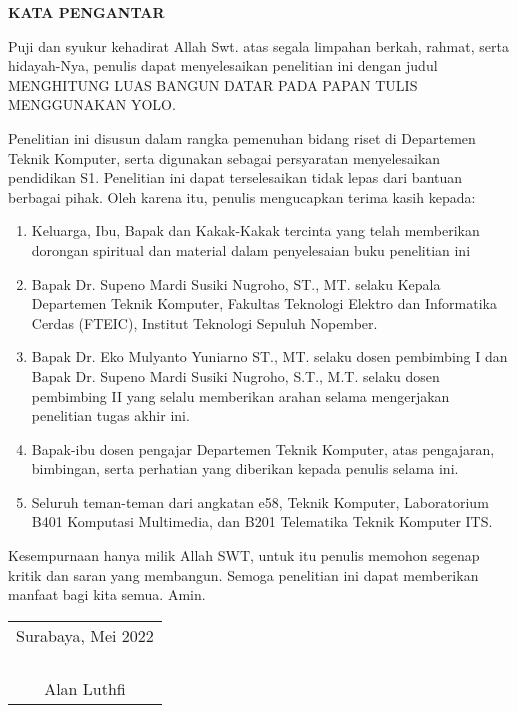 \begin{center}
  \Large
  \textbf{KATA PENGANTAR}
\end{center}


\vspace{2ex}


Puji dan syukur kehadirat Allah Swt. atas segala limpahan
berkah, rahmat, serta hidayah-Nya, penulis dapat menyelesaikan
penelitian ini dengan judul MENGHITUNG LUAS BANGUN DATAR PADA PAPAN TULIS MENGGUNAKAN YOLO.

Penelitian ini disusun dalam rangka pemenuhan bidang riset
di Departemen Teknik Komputer, serta digunakan sebagai persyaratan menyelesaikan pendidikan S1. Penelitian ini dapat terselesaikan tidak lepas dari bantuan berbagai pihak. Oleh karena itu,
penulis mengucapkan terima kasih kepada:

\begin{enumerate}[nolistsep]

  \item Keluarga, Ibu, Bapak dan Kakak-Kakak tercinta yang telah
  memberikan dorongan spiritual dan material dalam penyelesaian buku penelitian ini

  \item Bapak Dr. Supeno Mardi Susiki Nugroho, ST., MT. selaku Kepala Departemen Teknik Komputer, Fakultas Teknologi
  Elektro dan Informatika Cerdas (FTEIC), Institut Teknologi
  Sepuluh Nopember.

  \item Bapak Dr. Eko Mulyanto Yuniarno ST., MT. selaku
  dosen pembimbing I dan Bapak Dr. Supeno Mardi Susiki Nugroho, S.T., M.T. selaku dosen pembimbing II yang selalu memberikan arahan selama mengerjakan penelitian tugas akhir ini.
  
  \item Bapak-ibu dosen pengajar Departemen Teknik Komputer, atas
  pengajaran, bimbingan, serta perhatian yang diberikan kepada penulis selama ini.
  
  \item Seluruh teman-teman dari angkatan e58, Teknik Komputer,
  Laboratorium B401 Komputasi Multimedia, dan B201 Telematika Teknik Komputer ITS.

\end{enumerate}

Kesempurnaan hanya milik Allah SWT, untuk itu penulis memohon segenap kritik dan saran yang membangun. Semoga penelitian ini dapat memberikan manfaat bagi kita semua. Amin.

\begin{flushright}
  \begin{tabular}[b]{c}
    Surabaya, Mei 2022\\
    \\
    \\
    \\
    \\
    Alan Luthfi
  \end{tabular}
\end{flushright}
